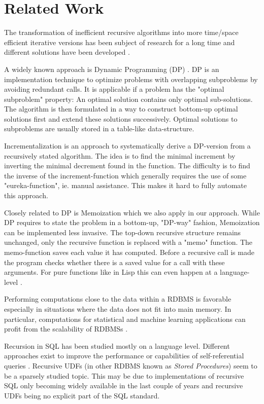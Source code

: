 \section{Related Work}

The transformation of inefficient recursive algorithms into more time/space efficient iterative versions has been subject of research for a long time and different solutions have been developed \cite{redundantRecRemoval, transformingRecProgs, recursionRemoval, changeEvalOrder, programTransformation}.

A widely known approach is Dynamic Programming (DP) \cite{DP_Bellman}. DP is an implementation technique to optimize problems with overlapping subproblems by avoiding redundant calls. It is applicable if a problem has the "optimal subproblem" property: An optimal solution contains only optimal sub-solutions. The algorithm is then formulated in a way to construct bottom-up optimal solutions first and extend these solutions successively. Optimal solutions to subproblems are usually stored in a table-like data-structure. \cite[p. 363 ff.]{Cormen}

Incrementalization is an approach to systematically derive a DP-version from a recursively stated algorithm. The idea is to find the minimal increment by inverting the minimal decrement found in the function. The difficulty is to find the inverse of the increment-function which generally requires the use of some "eureka-function", ie. manual assistance. This makes it hard to fully automate this approach. \cite{incrementalization}

Closely related to DP is Memoization \cite{memo} which we also apply in our approach. While DP requires to state the problem in a bottom-up, "DP-way" fashion, Memoization can be implemented less invasive. The top-down recursive structure remains unchanged, only the recursive function is replaced with a "memo" function. The memo-function saves each value it has computed. Before a recursive call is made the program checks whether there is a saved value for a call with these arguments. For pure functions like in Lisp this can even happen at a language-level \cite{norvig_memoization}. \cite[p. 390 ff.]{Cormen}

Performing computations close to the data within a RDBMS is favorable especially in situations where the data does not fit into main memory. In particular, computations for statistical and machine learning applications can profit from the scalability of RDBMSs \cite{SQLforML,PCAinSQL,MLwithUDFs,MLinSQL2,decisionTables}.

Recursion in SQL has been studied mostly on a language level. Different approaches exist to improve the performance or capabilities of self-referential queries \cite{LRoptimizations, optimizingRecursiveQueries, extendingRecursionInSQL, RCTEplanningOptimization}. Recursive UDFs (in other RDBMS known as \textit{Stored Procedures}) seem to be a sparsely studied topic. This may be due to implementations of recursive SQL only becoming widely available in the last couple of years \cite{RSQLsurvey} and recursive UDFs being no explicit part of the SQL standard.